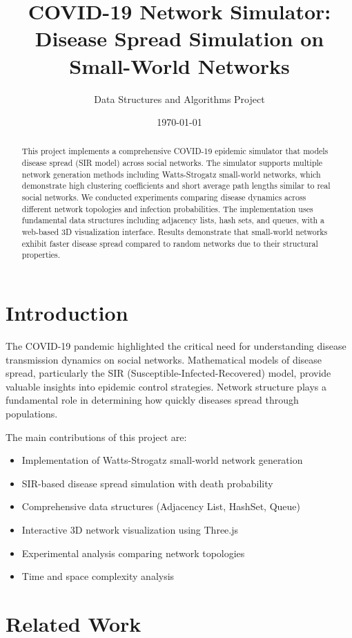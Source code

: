 \documentclass[12pt,a4paper]{article}
\title{\textbf{COVID-19 Network Simulator: \\ Disease Spread Simulation on Small-World Networks}}
\author{Data Structures and Algorithms Project}
\date{\today}
\begin{document}
\maketitle

\begin{abstract}
This project implements a comprehensive COVID-19 epidemic simulator that models disease spread (SIR model) across social networks. The simulator supports multiple network generation methods including Watts-Strogatz small-world networks, which demonstrate high clustering coefficients and short average path lengths similar to real social networks. We conducted experiments comparing disease dynamics across different network topologies and infection probabilities. The implementation uses fundamental data structures including adjacency lists, hash sets, and queues, with a web-based 3D visualization interface. Results demonstrate that small-world networks exhibit faster disease spread compared to random networks due to their structural properties.
\end{abstract}

\section{Introduction}

The COVID-19 pandemic highlighted the critical need for understanding disease transmission dynamics on social networks. Mathematical models of disease spread, particularly the SIR (Susceptible-Infected-Recovered) model, provide valuable insights into epidemic control strategies. Network structure plays a fundamental role in determining how quickly diseases spread through populations.

The main contributions of this project are:
\begin{itemize}
    \item Implementation of Watts-Strogatz small-world network generation
    \item SIR-based disease spread simulation with death probability
    \item Comprehensive data structures (Adjacency List, HashSet, Queue)
    \item Interactive 3D network visualization using Three.js
    \item Experimental analysis comparing network topologies
    \item Time and space complexity analysis
\end{itemize}

\section{Related Work}
\end{document}
